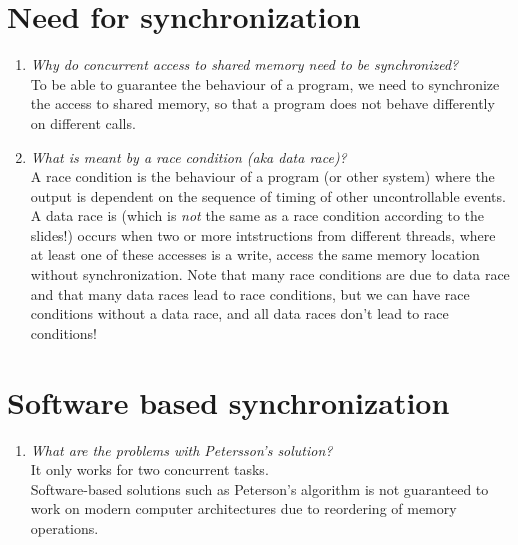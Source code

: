 \documentclass[a4paper]{article}
\begin{document}
\section{Need for synchronization}
\begin{enumerate}
  \item \textit{ Why do concurrent access to shared memory need to be synchronized? }\\

    To be able to guarantee the behaviour of a program, we need to synchronize the access to shared memory, so that a program does not behave differently on different calls.

  \item  \textit{What is meant by a race condition (aka data race)? }\\

    A race condition is the behaviour of a program (or other system) where the output is dependent on the sequence of timing of other uncontrollable events. A data race is (which is \emph{not} the same as a race condition according to the slides!) occurs when two or more intstructions from different threads, where at least one of these accesses is a write, access the same memory location without synchronization. Note that many race conditions are due to data race and that many data races lead to race conditions, but we can have race conditions without a data race, and all data races don't lead to race conditions!
\end{enumerate}

\section{Software based synchronization}
\begin{enumerate}
  \item  \textit{What are the problems with Petersson's solution? }\\

    It only works for two concurrent tasks. \\
    Software-based solutions such as Peterson's algorithm is not guaranteed to work on modern computer architectures due to reordering of memory operations.
\end{enumerate}
\end{document}
